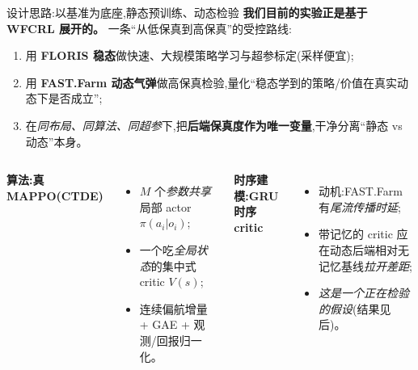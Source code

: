 \documentclass[aspectratio=169,11pt,UTF8]{ctexbeamer}
\newcommand{\emphb}[1]{\textcolor{myred}{\textbf{#1}}}
\newcommand{\emphg}[1]{\textcolor{mygreen}{\textbf{#1}}}
\begin{document}
\begin{frame}{设计思路:以基准为底座,静态预训练、动态检验}
\small
\emphg{我们目前的实验正是基于 WFCRL 展开的。} 一条“从低保真到高保真”的受控路线:
\begin{enumerate}\setlength\itemsep{2pt}
  \item 用 \textbf{FLORIS 稳态}做快速、大规模策略学习与超参标定(采样便宜);
  \item 用 \textbf{FAST.Farm 动态气弹}做高保真检验,量化“稳态学到的策略/价值在真实动态下是否成立”;
  \item 在\emph{同布局、同算法、同超参}下,把\emphb{后端保真度作为唯一变量},干净分离“静态 vs 动态”本身。
\end{enumerate}
\vspace{1mm}
\begin{columns}[T]
\textbf{算法:真 MAPPO(CTDE)}
\begin{itemize}\setlength\itemsep{1pt}
  \item $M$ 个\emph{参数共享}局部 actor $\pi(a_i|o_i)$;
  \item 一个吃\emph{全局状态}的集中式 critic $V(s)$;
  \item 连续偏航增量 + GAE + 观测/回报归一化。
\end{itemize}
\textbf{时序建模:GRU 时序 critic}
\begin{itemize}\setlength\itemsep{1pt}
  \item 动机:FAST.Farm 有\emph{尾流传播时延};
  \item 带记忆的 critic 应在动态后端相对无记忆基线\emph{拉开差距};
  \item \emph{这是一个正在检验的假设}(结果见后)。
\end{itemize}
\end{columns}
\end{frame}
\end{document}
